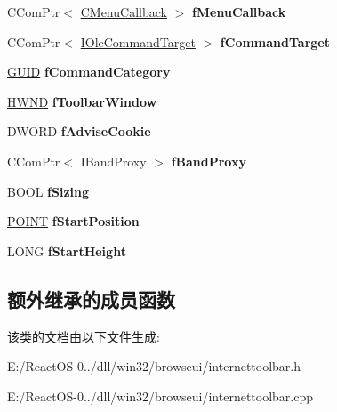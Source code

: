 \begin{DoxyCompactItemize}
C\+Com\+Ptr$<$ \hyperlink{class_c_menu_callback}{C\+Menu\+Callback} $>$ {\bfseries f\+Menu\+Callback}
\item 
\mbox{\label{class_c_internet_toolbar_adccb2dae87cc4ad9acc859bcf338a5e7}} 
C\+Com\+Ptr$<$ \hyperlink{interface_i_ole_command_target}{I\+Ole\+Command\+Target} $>$ {\bfseries f\+Command\+Target}
\item 
\mbox{\label{class_c_internet_toolbar_af2ebf397c17a73ba4cc6dfd684c6b388}} 
\hyperlink{interface_g_u_i_d}{G\+U\+ID} {\bfseries f\+Command\+Category}
\item 
\mbox{\label{class_c_internet_toolbar_a722590bd7fbd02b755520d61114cd2bc}} 
\hyperlink{interfacevoid}{H\+W\+ND} {\bfseries f\+Toolbar\+Window}
\item 
\mbox{\label{class_c_internet_toolbar_a3fabd06a53d80ab480e856be042dbbe3}} 
D\+W\+O\+RD {\bfseries f\+Advise\+Cookie}
\item 
\mbox{\label{class_c_internet_toolbar_a60f43ee0f1ce959e1a64e6c4b76b533a}} 
C\+Com\+Ptr$<$ I\+Band\+Proxy $>$ {\bfseries f\+Band\+Proxy}
\item 
\mbox{\label{class_c_internet_toolbar_a860f7f457d075a4ba92047b24382837d}} 
B\+O\+OL {\bfseries f\+Sizing}
\item 
\mbox{\label{class_c_internet_toolbar_a61fdbdac0719e455d241fb6521836660}} 
\hyperlink{structtag_p_o_i_n_t}{P\+O\+I\+NT} {\bfseries f\+Start\+Position}
\item 
\mbox{\label{class_c_internet_toolbar_a8a5c0a53decb5a73dc34235d0a62840a}} 
L\+O\+NG {\bfseries f\+Start\+Height}
\end{DoxyCompactItemize}
\subsection*{额外继承的成员函数}


该类的文档由以下文件生成\+:\begin{DoxyCompactItemize}
\item 
E\+:/\+React\+O\+S-\/0../dll/win32/browseui/internettoolbar.\+h\item 
E\+:/\+React\+O\+S-\/0../dll/win32/browseui/internettoolbar.\+cpp\end{DoxyCompactItemize}
